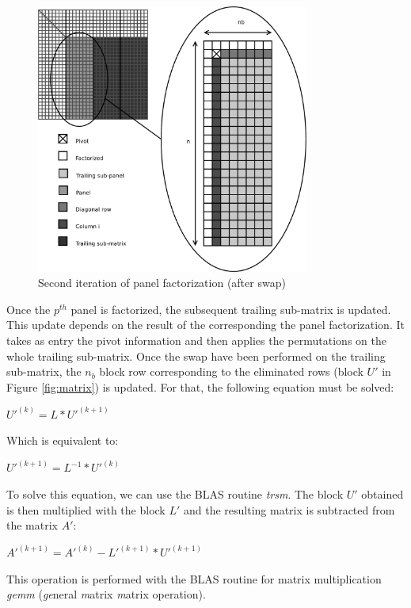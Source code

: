 \begin{figure}[!ht]
\centering
\includegraphics[width=0.8\textwidth]{figures/panel.pdf}
\caption{Second iteration of panel factorization (after swap)\label{fig:panel}}
\end{figure}

Once the $p^{th}$ panel is factorized, the subsequent trailing sub-matrix is updated. This update depends on the result of the corresponding the panel factorization. It takes as entry the pivot information and then applies the permutations on the whole trailing sub-matrix. Once the swap have been performed on the trailing sub-matrix, the $n_b$ block row corresponding to the eliminated rows (block $U'$ in Figure \ref{fig:matrix}) is updated. For that, the following equation must be solved:
\begin{center}
$U'^{(k)} = L*U'^{(k+1)}$
\end{center}
Which is equivalent to:
\begin{center}
$U'^{(k+1)} = L^{-1}*U'^{(k)}$
\end{center}
To solve this equation, we can use the BLAS routine \textit{trsm}. The block $U'$ obtained is then multiplied with the block $L'$ and the resulting matrix is subtracted from the matrix $A'$:
\begin{center}
$A'^{(k+1)} = A'^{(k)} - L'^{(k+1)}*U'^{(k+1)}$
\end{center}
This operation is performed with the BLAS routine for matrix multiplication \textit{gemm} (\emph{ge}neral \emph{m}atrix \emph{m}atrix operation).


